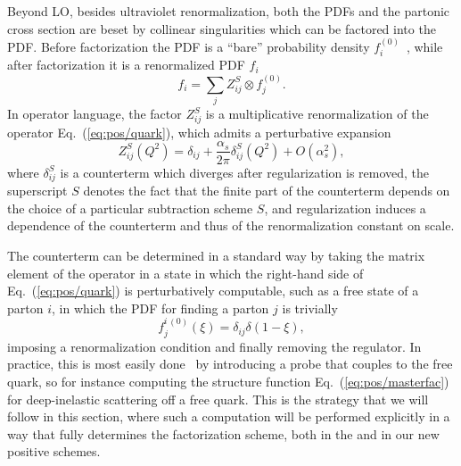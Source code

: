 Beyond LO, besides ultraviolet renormalization, both the
PDFs and the partonic cross section are beset by collinear
singularities which can be factored into the PDF. Before
factorization the PDF is a ``bare'' probability density $f_i^{(0)}$~\cite{Collins:2011zzd}, while after
factorization it is a
renormalized PDF  $f_i$
\begin{equation}
  \label{eq:pos/pdffac}
f_i =\sum_{j} Z^S_{ij}\otimes f_j^{(0)}. %
\end{equation}
In operator language, the  factor $Z^S_{ij}$ is a multiplicative
renormalization of the operator Eq.~(\ref{eq:pos/quark}), which admits a
perturbative expansion
\begin{equation}\label{eq:pos/pertz}
Z^S_{ij}(Q^2)=\delta_{ij}+\frac{\alpha_s}{2\pi}
\delta^S_{ij}(Q^2)+O(\alpha_s^2),
\end{equation}
where $\delta^S_{ij}$ is a counterterm which diverges after
regularization is removed, the superscript $S$ denotes the fact
that the finite part of the counterterm depends on the choice of a
particular subtraction scheme $S$, and regularization induces a
dependence of the counterterm and thus of the renormalization constant
on scale.

The counterterm can be determined
in a standard way by taking the matrix element of the
operator in a state in which the right-hand side of
Eq.~(\ref{eq:pos/quark}) is perturbatively computable, such as a free
state of a parton $i$, in which the PDF for finding a parton $j$ is
trivially
\begin{equation} \label{eq:pos/freef}
  f_j^{i\,(0)}(\xi)=\delta_{ij}\delta(1-\xi),
\end{equation}
imposing a
renormalization condition and finally removing the regulator. In practice, this
is most easily done~\cite{Collins:2011zzd,Curci:1980uw} by introducing
a probe that couples to the free 
quark, so for instance computing the structure function
Eq.~(\ref{eq:pos/masterfac}) for deep-inelastic scattering off a free
quark. This is the strategy that we will follow in this section, where
such a computation will be performed explicitly in a way that fully
determines the factorization scheme, both in the \msbar{} and in our
new positive schemes.



